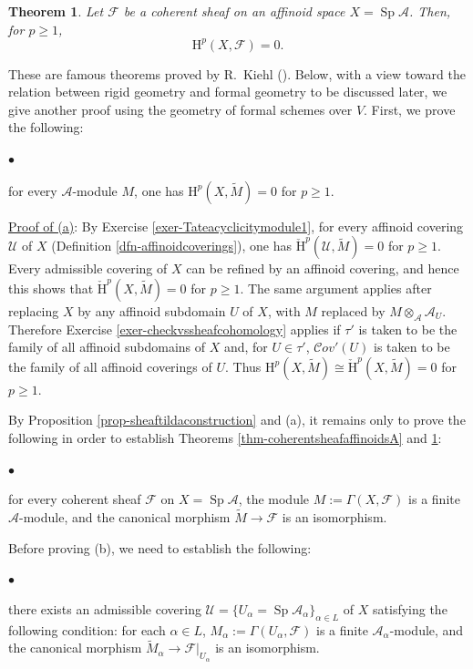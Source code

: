\documentclass[a4paper,12pt, dvipdfmx]{jsbook}
\def\til#1{\widetilde{#1}}%
\def\Sp{\mathop{\mathrm{Sp}}\nolimits}
\def\H{\mathrm{H}}
\def\vH{\mathrm{\check{H}}}
\def\Cov{\mathcal{C}\textit{ov}}
\renewenvironment{itemize}%
{%
   \begin{list}{\parbox{1zw}{$\bullet$}}%
   {%
      \setlength{\topsep}{.5zh}
      \setlength{\itemindent}{0zw}
      \setlength{\leftmargin}{3zw}%
      \setlength{\rightmargin}{0zw}%
      \setlength{\labelsep}{.5zw}%
      \setlength{\labelwidth}{3zw}%
      \setlength{\itemsep}{0.2em}%
      \setlength{\parsep}{0em}%
      \setlength{\listparindent}{0zw}%
   }
}{%
   \end{list}%
}
\theoremstyle{plain}
\newtheorem{thm}{\bfseries Theorem}[section]
\theoremstyle{definition}
\begin{document}
\begin{thm}\label{thm-coherentsheafaffinoidsB}{\rm 
Let $\mathscr{F}$ be a coherent sheaf on an affinoid space $X=\Sp\mathcal{A}$. Then, for $p\geq 1$,
$$
\H^p(X,\mathscr{F})=0.
$$}
\end{thm}

These are famous theorems proved by R.\ Kiehl (\cite{Kieh3}).
Below, with a view toward the relation between rigid geometry and formal geometry to be discussed later, we give another proof using the geometry of formal schemes over $V$.
First, we prove the following:
\begin{itemize}
\item[(a)] for every $\mathcal{A}$-module $M$, one has $\H^p(X,\til{M})=0$ for $p\geq 1$.
\end{itemize}

\medskip\noindent
\underline{Proof of (a)}: By Exercise \ref{exer-Tateacyclicitymodule1}, for every affinoid covering $\mathcal{U}$ of $X$ (Definition \ref{dfn-affinoidcoverings}), one has $\vH^p(\mathcal{U},\til{M})=0$ for $p\geq 1$.
Every admissible covering of $X$ can be refined by an affinoid covering, and hence this shows that $\vH^p(X,\til{M})=0$ for $p\geq 1$.
The same argument applies after replacing $X$ by any affinoid subdomain $U$ of $X$, with $M$ replaced by $M\otimes_{\mathcal{A}}\mathcal{A}_U$.
Therefore Exercise \ref{exer-checkvssheafcohomology} applies if $\tau'$ is taken to be the family of all affinoid subdomains of $X$ and, for $U\in\tau'$, $\Cov'(U)$ is taken to be the family of all affinoid coverings of $U$.
Thus $\H^p(X,\til{M})\cong\vH^p(X,\til{M})=0$ for $p\geq 1$.

\medskip
By Proposition \ref{prop-sheaftildaconstruction} and (a), it remains only to prove the following in order to establish Theorems \ref{thm-coherentsheafaffinoidsA} and \ref{thm-coherentsheafaffinoidsB}:
\begin{itemize}
\item[(b)] for every coherent sheaf $\mathscr{F}$ on $X=\Sp\mathcal{A}$, the module $M:=\Gamma(X,\mathscr{F})$ is a finite $\mathcal{A}$-module, and the canonical morphism $\til{M}\rightarrow\mathscr{F}$ is an isomorphism.
\end{itemize}
Before proving (b), we need to establish the following:
\begin{itemize}
\item [(c)] there exists an admissible covering $\mathcal{U}=\{U_{\alpha}=\Sp\mathcal{A}_{\alpha}\}_{\alpha\in L}$ of $X$ satisfying the following condition: for each $\alpha\in L$, $M_{\alpha}:=\Gamma(U_{\alpha},\mathscr{F})$ is a finite $\mathcal{A}_{\alpha}$-module, and the canonical morphism $\til{M}_{\alpha}\rightarrow\mathscr{F}|_{U_{\alpha}}$ is an isomorphism.
\end{itemize}
\end{document}
